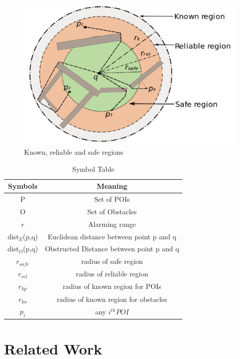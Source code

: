 \documentclass{sig-alternate}
\begin{document}
\begin{figure}[!htb]
  \includegraphics[width=\linewidth]{krs.png}
  \caption{Known, reliable and safe regions}\label{fig:krs}
\endminipage\hfill
\end{figure}

\begin{table}[h]
\centering

\caption{Symbol Table}
\begin{tabular}{|c|c|} \hline
Symbols&Meaning \\ \hline
P & Set of POIs\\ \hline
O & Set of Obstacles\\ \hline
$r$ & Alarming range\\ \hline
dist$_E$(p,q) & Euclidean distance between point p and q\\ \hline
dist$_O$(p,q) & Obstructed Distance between point p and q\\ \hline
$r_{safe}$    & radius of safe region\\ \hline
$r_{rel}$     & radius of reliable region\\ \hline
$r_{kp}$      &radius of known region for POIs\\ \hline
$r_{ko}$      &radius of known region for obstacles\\ \hline
$p_{i}$       &any $i^{th} POI$\\ \hline
\end{tabular}
\end{table}

 
\section{Related Work}
\end{document}

